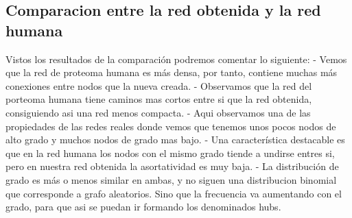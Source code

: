 \subsection{Comparacion entre la red obtenida y la red humana}
Vistos los resultados de la comparación podremos comentar lo siguiente:
- Vemos que la red de proteoma humana es más densa, por tanto, contiene muchas más conexiones entre nodos que la nueva creada.
- Observamos que la red del porteoma humana tiene caminos mas cortos entre si que la red obtenida, consiguiendo asi una red menos compacta.
- Aqui observamos una de las propiedades de las redes reales donde vemos que tenemos unos pocos nodos de alto grado y muchos nodos de grado mas bajo. 
- Una característica destacable es que en la red humana los nodos con el mismo grado tiende a undirse entres si, pero en nuestra red obtenida la asortatividad es muy baja.
- La distribución de grado es más o menos similar en ambas, y no siguen una distribucion binomial que corresponde a grafo aleatorios. Sino que la frecuencia va aumentando con el grado, para que asi se puedan ir formando los denominados hubs.
